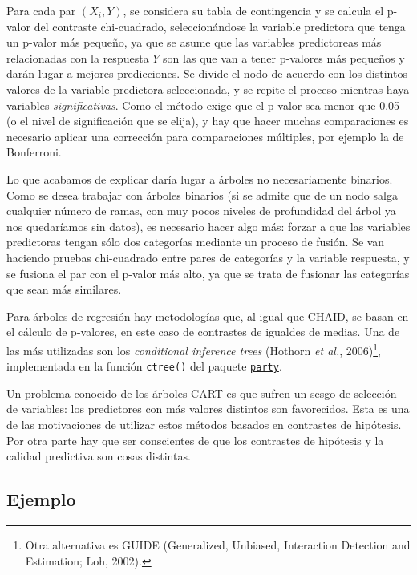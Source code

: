\documentclass[]{book}
\theoremstyle{break}
\theoremstyle{definition}
\theoremstyle{definition}
\theoremstyle{definition}
\theoremstyle{remark}
\begin{document}
Para cada par \((X_i, Y)\), se considera su tabla de contingencia y se
calcula el p-valor del contraste chi-cuadrado, seleccionándose la
variable predictora que tenga un p-valor más pequeño, ya que se asume
que las variables predictoreas más relacionadas con la respuesta \(Y\)
son las que van a tener p-valores más pequeños y darán lugar a mejores
predicciones. Se divide el nodo de acuerdo con los distintos valores de
la variable predictora seleccionada, y se repite el proceso mientras
haya variables \emph{significativas}. Como el método exige que el
p-valor sea menor que 0.05 (o el nivel de significación que se elija), y
hay que hacer muchas comparaciones es necesario aplicar una corrección
para comparaciones múltiples, por ejemplo la de Bonferroni.

Lo que acabamos de explicar daría lugar a árboles no necesariamente
binarios. Como se desea trabajar con árboles binarios (si se admite que
de un nodo salga cualquier número de ramas, con muy pocos niveles de
profundidad del árbol ya nos quedaríamos sin datos), es necesario hacer
algo más: forzar a que las variables predictoras tengan sólo dos
categorías mediante un proceso de fusión. Se van haciendo pruebas
chi-cuadrado entre pares de categorías y la variable respuesta, y se
fusiona el par con el p-valor más alto, ya que se trata de fusionar las
categorías que sean más similares.

Para árboles de regresión hay metodologías que, al igual que CHAID, se
basan en el cálculo de p-valores, en este caso de contrastes de igualdes
de medias. Una de las más utilizadas son los \emph{conditional inference
trees} (Hothorn \emph{et al.}, 2006)\footnote{Otra alternativa es GUIDE
  (Generalized, Unbiased, Interaction Detection and Estimation; Loh,
  2002).}, implementada en la función \texttt{ctree()} del paquete
\href{https://CRAN.R-project.org/package=party}{\texttt{party}}.

Un problema conocido de los árboles CART es que sufren un sesgo de
selección de variables: los predictores con más valores distintos son
favorecidos. Esta es una de las motivaciones de utilizar estos métodos
basados en contrastes de hipótesis. Por otra parte hay que ser
conscientes de que los contrastes de hipótesis y la calidad predictiva
son cosas distintas.

\subsection{Ejemplo}\label{ejemplo}
\end{document}
